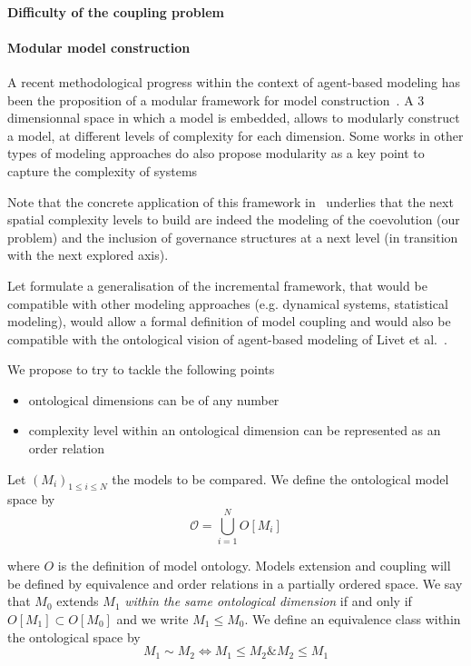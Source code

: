 \paragraph{Difficulty of the coupling problem}


\paragraph{Modular model construction}

A recent methodological progress within the context of agent-based modeling has been the proposition of a modular framework for model construction~\cite{cottineau2015incremental}. A 3 dimensionnal space in which a model is embedded, allows to modularly construct a model, at different levels of complexity for each dimension. Some works in other types of modeling approaches do also propose modularity as a key point to capture the complexity of systems

Note that the concrete application of this framework in~\cite{cottineau2014evolution} underlies that the next spatial complexity levels to build are indeed the modeling of the coevolution (our problem) and the inclusion of governance structures at a next level (in transition with the next explored axis).

Let formulate a generalisation of the incremental framework, that would be compatible with other modeling approaches (e.g. dynamical systems, statistical modeling), would allow a formal definition of model coupling and would also be compatible with the ontological vision of agent-based modeling of Livet et al.~\cite{livet2010}.

We propose to try to tackle the following points
\begin{itemize}
\item ontological dimensions can be of any number
\item complexity level within an ontological dimension can be represented as an order relation
\end{itemize}


Let $(M_i)_{1\leq i \leq N}$ the models to be compared. We define the ontological model space by
\[
\mathcal{O} = \bigcup_{i=1}^{N} O[M_i]
\]

where $O$ is the definition of model ontology.
Models extension and coupling will be defined by equivalence and order relations in a partially ordered space. We say that $M_0$ extends $M_1$ \emph{within the same ontological dimension} if and only if $O[M_1] \subset O[M_0]$ and we write $M_1 \leq M_0 $. We define an equivalence class within the ontological space by
\[
M_1 \sim M_2 \iff M_1 \leq M_2 \& M_2 \leq M_1  
\]


